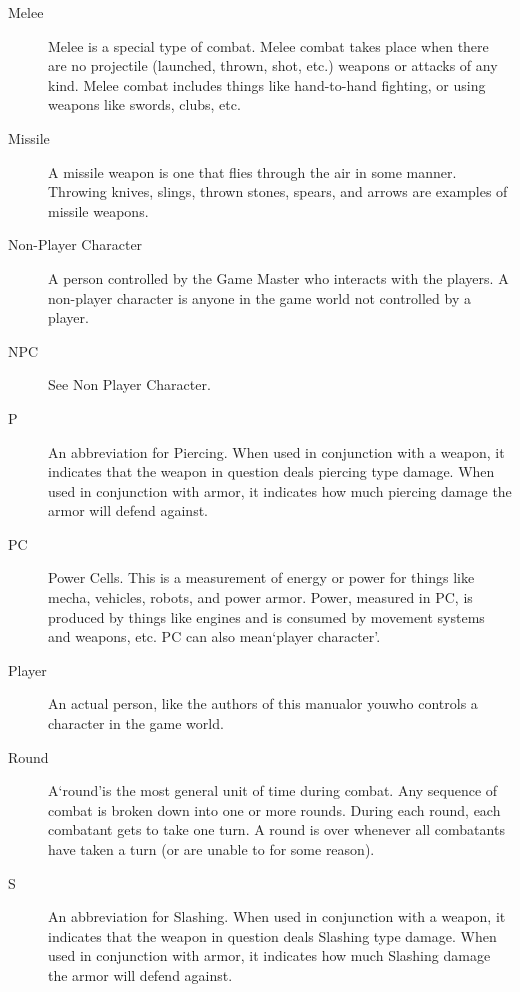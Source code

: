 \documentclass[twoside]{book}
\begin{document}
\begin{description}
  \item[Melee] 
    {  
    Melee is a special type of combat. Melee combat takes place when there are no projectile (launched, thrown, shot, etc.) weapons or attacks of any kind. Melee combat includes things like hand-to-hand fighting, or using weapons like swords, clubs, etc.
    }
  
  \item[Missile] 
    {  
    A missile weapon is one that flies through the air in some manner. Throwing knives, slings, thrown stones, spears, and arrows are examples of missile weapons.
    }
  
  \item[Non-Player Character] 
    {  
    A person controlled by the Game Master who interacts with the players. A non-player character is anyone in the game world not controlled by a player.
    }
  
  \item[NPC] 
    {  
    See Non Player Character.
    }
  
  \item[P] 
    {  
    An abbreviation for Piercing. When used in conjunction with a weapon, it indicates that the weapon in question deals piercing type damage. When used in conjunction with armor, it indicates how much piercing damage the armor will defend against.
    }
  
  \item[PC] 
    {  
    Power Cells. This is a measurement of energy or power for things like mecha, vehicles, robots, and power armor. Power, measured in PC, is produced by things like engines and is consumed by movement systems and weapons, etc. PC can also mean`player character'.
    }
  
  \item[Player] 
    {  
    An actual person, like the authors of this manualor youwho controls a character in the game world.
    }
  
  \item[Round] 
    {  
    A`round'is the most general unit of time during combat. Any sequence of combat is broken down into one or more rounds. During each round, each combatant gets to take one turn. A round is over whenever all combatants have taken a turn (or are unable to for some reason).
    }
  
  \item[S] 
    {  
    An abbreviation for Slashing. When used in conjunction with a weapon, it indicates that the weapon in question deals Slashing type damage. When used in conjunction with armor, it indicates how much Slashing damage the armor will defend against.
    }
  

\end{description}
\end{document}
